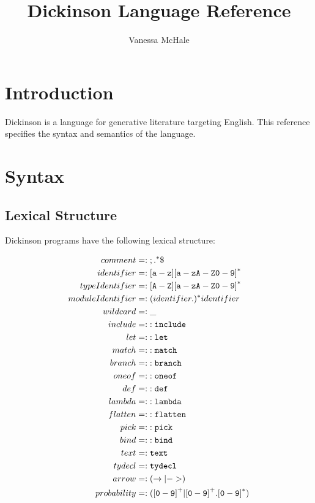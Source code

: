 \documentclass{report}
\begin{document}
\title{Dickinson Language Reference}
\author {Vanessa McHale}
\maketitle

\tableofcontents

\section{Introduction}

Dickinson is a language for generative literature targeting English. This reference specifies the syntax and semantics of the language.

\section{Syntax}

\subsection{Lexical Structure}

Dickinson programs have the following lexical structure:

\begin{align*}
    comment &=: {\tt ; .}^*\$ \\
    identifier &=: {\tt [a-z][a-zA-Z0-9]}^* \\
    typeIdentifier &=: {\tt [A-Z][a-zA-Z0-9]}^* \\
    moduleIdentifier &=: (identifier.)^* identifier \\
    wildcard &=: \_ \\
    include &=: {\tt :include} \\
    let &=: {\tt :let} \\
    match &=: {\tt :match} \\
    branch &=: {\tt :branch} \\
    oneof &=: {\tt :oneof} \\
    def &=: {\tt :def} \\
    lambda &=: {\tt :lambda} \\
    flatten &=: {\tt :flatten} \\
    pick &=: {\tt :pick} \\
    bind &=: {\tt :bind} \\
    text &=: {\tt text} \\
    tydecl &=: {\tt tydecl} \\
    arrow &=: (\rightarrow | {\tt ->}) \\
    probability &=: ({\tt [0-9]}^+| {\tt [0-9]}^+.{\tt [0-9]}^*)
\end{align*}
\end{document}
